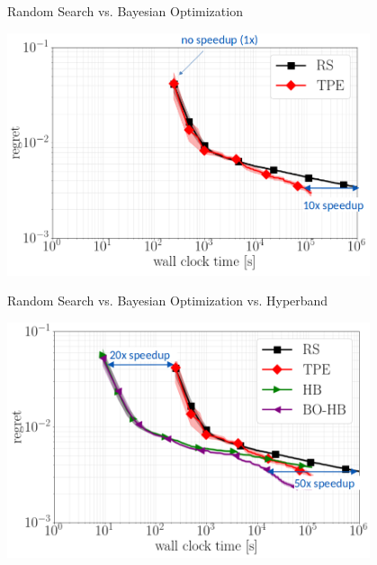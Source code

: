 \begin{frame}[c,fragile]{Random Search vs. Bayesian Optimization}

\centering
\includegraphics[width=0.8\textwidth]{images/randomsearch_bo}

\end{frame}
\begin{frame}[c,fragile]{Random Search vs. Bayesian Optimization vs. Hyperband}

\centering
\includegraphics[width=0.8\textwidth]{images/randomsearch_bohb}

\end{frame}
